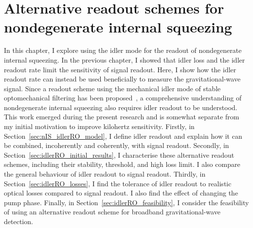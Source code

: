 \chapter{Alternative readout schemes for nondegenerate internal squeezing}
\label{chp:idler_readout}

In this chapter, I explore using the idler mode for the readout of nondegenerate internal squeezing. In the previous chapter, I showed that idler loss and the idler readout rate limit the sensitivity of signal readout. Here, I show how the idler readout rate can instead be used beneficially to measure the gravitational-wave signal.
Since a readout scheme using the mechanical idler mode of stable optomechanical filtering has been proposed~\cite{liEnhancingInterferometerSensitivity2021}, a comprehensive understanding of nondegenerate internal squeezing also requires idler readout to be understood. This work emerged during the present research and is somewhat separate from my initial motivation to improve kilohertz sensitivity. %
Firstly, in Section~\ref{sec:nIS_idlerRO_model}, I define idler readout and explain how it can be combined, incoherently and coherently, with signal readout. %
Secondly, in Section~\ref{sec:idlerRO_initial_results}, I characterise these alternative readout schemes, including their stability, threshold, and high loss limit. I also compare the general behaviour of idler readout to signal readout. %
Thirdly, in Section~\ref{sec:idlerRO_losses}, I find the tolerance of idler readout to realistic optical losses compared to signal readout. %
I also find the effect of changing the pump phase.  
Finally, in Section~\ref{sec:idlerRO_feasibility}, I consider the feasibility of using an alternative readout scheme for broadband gravitational-wave detection. %


